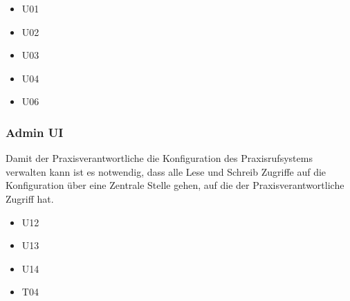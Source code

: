 \begin{itemize}
    \item U01
    \item U02
    \item U03
    \item U04
    \item U06
\end{itemize}

\subsubsection*{Admin UI}

Damit der Praxisverantwortliche die Konfiguration des Praxisrufsystems verwalten kann ist es notwendig, dass alle
Lese und Schreib Zugriffe auf die Konfiguration über eine Zentrale Stelle gehen, auf die der Praxisverantwortliche Zugriff hat.

\begin{itemize}
    \item U12
    \item U13
    \item U14
    \item T04
\end{itemize}

\clearpage
